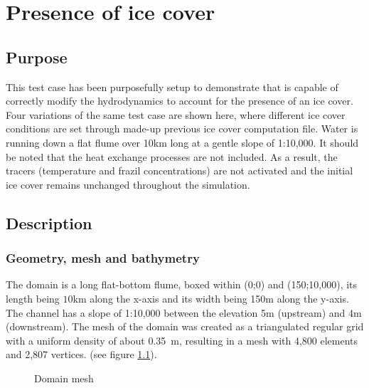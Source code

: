 \renewcommand{\labelitemi}{$\triangleright$}

\chapter{Presence of ice cover}
%
%
\section{Purpose}
This test case has been purposefully setup to demonstrate that \khione is capable of correctly modify the hydrodynamics to account for the presence of an ice cover.
Four variations of the same test case are shown here, where different ice cover conditions are set through made-up previous ice cover computation file. Water is running down a flat flume over 10km long at a gentle slope of 1:10,000.
It should be noted that the heat exchange processes are not included. As a result, the tracers (temperature and frazil concentrations) are not activated and the initial ice cover remains unchanged throughout the simulation.

\section{Description}

\subsection{Geometry, mesh and bathymetry}

The domain is a long flat-bottom flume, boxed within (0;0) and (150;10,000), its length being $10$km along the x-axis and its width being 150m along the y-axis. The channel has a slope of 1:10,000 between the elevation 5m (upstream) and 4m (downstream).
The mesh of the domain was created as a triangulated regular grid with a uniform density of about 0.35~m, resulting in a mesh with 4,800 elements and 2,807 vertices. (see figure \ref{fig:cover_mesh}).

\begin{figure}[H]
    \begin{center}
    \end{center}
    \caption{Domain mesh}
    \label{fig:cover_mesh}
\end{figure}

